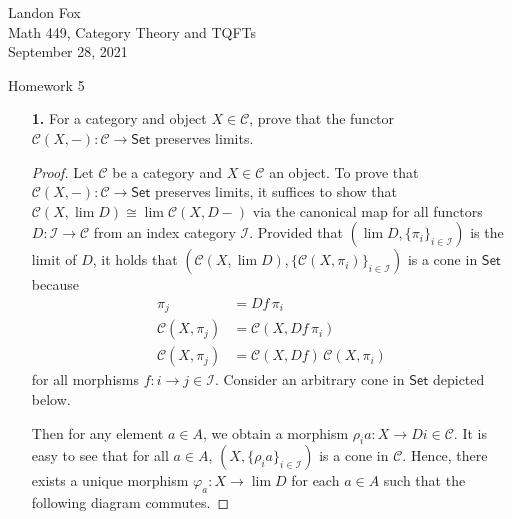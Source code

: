 \documentclass[ 12pt ]{article}
\begin{document}
\noindent Landon Fox \\
\noindent Math 449, Category Theory and TQFTs \\
\noindent September 28, 2021

\begin{center}
\Large Homework 5
\end{center}

\begin{enumerate}

	\item[\textbf{1.}] For a category and object $X \in \mathscr{C}$, prove that the functor $\mathscr{C}(X, -) : \mathscr{C} \to \mathsf{Set}$ preserves limits.

		\begin{proof}
			Let $\mathscr{C}$ be a category and $X \in \mathscr{C}$ an object. To prove that $\mathscr{C}(X, -) : \mathscr{C} \to \mathsf{Set}$ preserves limits, it suffices to show that $\mathscr{C}(X, \lim D) \cong \lim \mathscr{C}(X, D-)$ via the canonical map for all functors $D : \mathscr{I} \to \mathscr{C}$ from an index category $\mathscr{I}$. Provided that $(\lim D, \{\pi_i\}_{i \in \mathscr{I}})$ is the limit of $D$, it holds that $(\mathscr{C}(X, \lim D), \{\mathscr{C}(X, \pi_i)\}_{i \in \mathscr{I}})$ is a cone in $\mathsf{Set}$ because
			\begin{align*}
				\pi_j &= Df\, \pi_i \\
				\mathscr{C}(X, \pi_j) &= \mathscr{C}(X, Df\, \pi_i) \\
				\mathscr{C}(X, \pi_j) &= \mathscr{C}(X, Df)\, \mathscr{C}(X, \pi_i)
			\end{align*}
			for all morphisms $f : i \to j \in \mathscr{I}$. Consider an arbitrary cone in $\mathsf{Set}$ depicted below.
			\begin{center}
			\end{center}
			Then for any element $a \in A$, we obtain a morphism $\rho_i a : X \to Di \in \mathscr{C}$. It is easy to see that for all $a \in A$, $(X, \{\rho_i a\}_{i \in \mathscr{I}})$ is a cone in $\mathscr{C}$. Hence, there exists a unique morphism $\varphi_a : X \to \lim D$ for each $a \in A$ such that the following diagram commutes.

\end{proof}
\end{enumerate}
\end{document}
